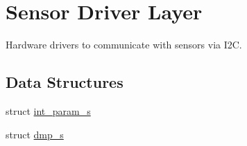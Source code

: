 \hypertarget{group___d_r_i_v_e_r_s}{}\section{Sensor Driver Layer}
\label{group___d_r_i_v_e_r_s}


Hardware drivers to communicate with sensors via I2C.  


\subsection*{Data Structures}
\begin{DoxyCompactItemize}
\item 
struct \hyperlink{structint__param__s}{int\+\_\+param\+\_\+s}
\item 
struct \hyperlink{structdmp__s}{dmp\+\_\+s}
\end{DoxyCompactItemize}

